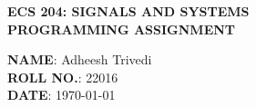\documentclass{article}
\begin{document}
\begin{center}
    \textbf{
    \LARGE{ECS 204: SIGNALS AND SYSTEMS} \\
    \LARGE{PROGRAMMING ASSIGNMENT} \\
    }
\end{center}\vspace{25pt}
\large {
    \textbf{NAME}: Adheesh Trivedi \\
    \textbf{ROLL NO.}: 22016 \\
    \textbf{DATE}: \today \\
    \\
}

\newcommand{\quesNo}{1}


\renewcommand{\quesNo}{2}


\renewcommand{\quesNo}{3}

\end{document}
